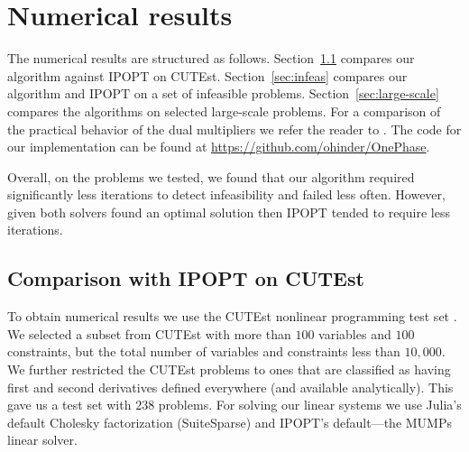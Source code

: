 \documentclass{article}
\begin{document}

\section{Numerical results}\label{sec:numerical-results}

 The numerical results are structured as follows. Section~\ref{alg:comparison-IPOPT} compares our algorithm against IPOPT on CUTEst. Section~\ref{sec:infeas} compares our algorithm and IPOPT on a set of infeasible problems. Section~\ref{sec:large-scale} compares the algorithms on selected large-scale problems. For a comparison of the practical behavior of the dual multipliers we refer the reader to \cite{haeser2017behavior}. The code for our implementation can be found at \url{https://github.com/ohinder/OnePhase}.
 
 
Overall, on the problems we tested, we found that our algorithm required significantly less iterations to detect infeasibility and failed less often. However, given both solvers found an optimal solution then IPOPT tended to require less iterations.

 

\subsection{Comparison with IPOPT on CUTEst}\label{alg:comparison-IPOPT}

To obtain numerical results we use the CUTEst nonlinear programming test set \cite{gould2015cutest}. We selected a subset from CUTEst with more than $100$ variables and $100$ constraints, but the total number of variables and constraints less than $10,000$. We further restricted the CUTEst problems to ones that are classified as having first and second derivatives defined everywhere (and available analytically). This gave us a test set with $238$ problems. For solving our linear systems we use Julia's default Cholesky factorization (SuiteSparse) and IPOPT's default---the MUMPs linear solver.
\end{document}
